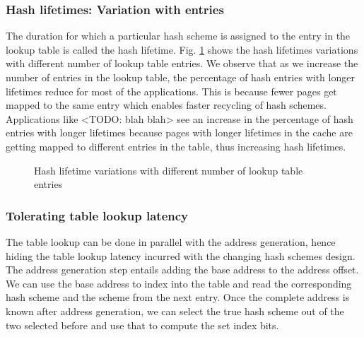 \subsubsection{Hash lifetimes: Variation with entries}
The duration for which a particular hash scheme is assigned to the entry in the lookup table is called the hash lifetime. Fig. \ref{figure:Hash_lifetime} shows the hash lifetimes variations with different number of lookup table entries. We observe that as we increase the number of entries in the lookup table, the percentage of hash entries with longer lifetimes reduce for most of the applications. This is because fewer pages get mapped to the same entry which enables faster recycling of hash schemes. Applications like <TODO: blah blah> see an increase in the percentage of hash entries with longer lifetimes because pages with longer lifetimes in the cache are getting mapped to different entries in the table, thus increasing hash lifetimes.
\begin{figure}
  \caption{Hash lifetime variations with different number of lookup table entries}
  \label{figure:Hash_lifetime}
\end{figure}

\subsubsection{Tolerating table lookup latency}
The table lookup can be done in parallel with the address generation, hence hiding the table lookup latency incurred with the changing hash schemes design. The address generation step entails adding the base address to the address offset. We can use the base address to index into the table and read the corresponding hash scheme and the scheme from the next entry. Once the complete address is known after address generation, we can select the true hash scheme out of the two selected before and use that to compute the set index bits. 

